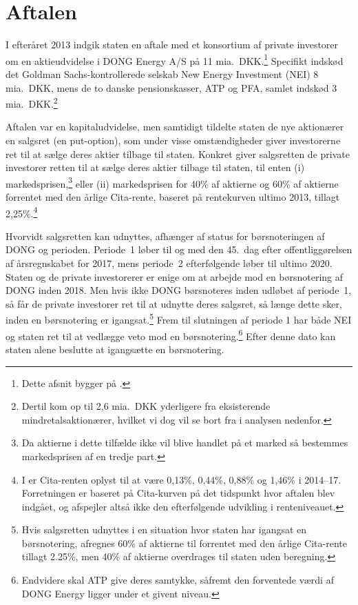 \documentclass{article}
\begin{document}
\section{Aftalen}
I efteråret 2013 indgik staten en aftale med et konsortium af private investorer om en aktieudvidelse i DONG Energy A/S på 11 mia.\ DKK.\footnote{Dette afsnit bygger på \citet{FM2013a}.} Specifikt indskød det Goldman Sachs-kontrollerede selskab New Energy Investment (NEI) 8 mia.\ DKK, mens de to danske pensionskasser, ATP og PFA, samlet indskød 3 mia.\ DKK.\footnote{Dertil kom op til 2,6 mia.\ DKK yderligere fra eksisterende mindretalsaktionærer, hvilket vi dog vil se bort fra i analysen nedenfor.}

Aftalen var en kapitaludvidelse, men samtidigt tildelte staten de nye aktionærer en salgsret (en put-option), som under visse omstændigheder giver investorerne ret til at sælge deres aktier tilbage til staten. Konkret giver salgsretten de private investorer retten til at sælge deres aktier tilbage til staten,  til enten (i) markedsprisen,\footnote{Da aktierne i dette tilfælde ikke vil blive handlet på et marked så bestemmes markedsprisen af en tredje part.} eller (ii) markedsprisen for 40\% af aktierne og 60\% af aktierne forrentet med den årlige Cita-rente, baseret på rentekurven ultimo 2013, tillagt 2,25\%.\footnote{I \citet{FM2013f} er Cita-renten oplyst til at være 0,13\%, 0,44\%, 0,88\% og 1,46\% i 2014--17. Forretningen er baseret på Cita-kurven på det tidspunkt hvor aftalen blev indgået, og afspejler altså ikke den efterfølgende udvikling i renteniveauet.}

Hvorvidt salgsretten kan udnyttes, afhænger af status for børsnoteringen af DONG og perioden. Periode~1 løber til og med den 45.\ dag efter offentliggørelsen af årsregnskabet for 2017, mens periode~2 efterfølgende løber til ultimo 2020. Staten og de private investorerer er enige om at arbejde mod en børsnotering af DONG inden 2018. Men hvis ikke DONG børsnoteres inden udløbet af periode~1, så får de private investorer ret til at udnytte deres salgsret, så længe dette sker, inden en børsnotering er igangsat.\footnote{Hvis salgsretten udnyttes i en situation hvor staten har igangsat en børsnotering, afregnes 60\% af aktierne til  forrentet med den årlige Cita-rente tillagt 2.25\%, men 40\% af aktierne overdrages til staten uden beregning.} Frem til slutningen af periode 1 har både NEI og staten ret til at vedlægge veto mod en børsnotering.\footnote{Endvidere skal ATP give deres samtykke, såfremt den forventede værdi af DONG Energy ligger under et givent niveau.} Efter denne dato kan staten alene beslutte at igangsætte en børsnotering.
\end{document}
